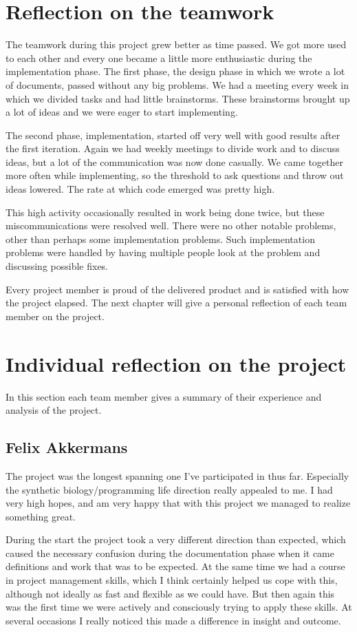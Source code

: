 \documentclass[a4paper]{article}
\begin{document}
\section{Reflection on the teamwork}
\label{team-reflection}
The teamwork during this project grew better as time passed. We got more used to each other and every one became a little more enthusiastic during the implementation phase. The first phase, the design phase in which we wrote a lot of documents, passed without any big problems. We had a meeting every week in which we divided tasks and had little brainstorms. These brainstorms brought up a lot of ideas and we were eager to start implementing.

The second phase, implementation, started off very well with good results after the first iteration. Again we had weekly meetings to divide work and to discuss ideas, but a lot of the communication was now done casually. We came together more often while implementing, so the threshold to ask questions and throw out ideas lowered. The rate at which code emerged was pretty high.

This high activity occasionally resulted in work being done twice, but these miscommunications were resolved well. There were no other notable problems, other than perhaps some implementation problems. Such implementation problems were handled by having multiple people look at the problem and discussing possible fixes.

Every project member is proud of the delivered product and is satisfied with how the project elapsed. The next chapter will give a personal reflection of each team member on the project.

\section{Individual reflection on the project} %
\label{individual-reflection}
In this section each team member gives a summary of their experience and analysis of the project.
\subsection{Felix Akkermans}
The project was the longest spanning one I've participated in thus far. Especially the synthetic biology/programming life direction really appealed to me. I had very high hopes, and am very happy that with this project we managed to realize something great.

During the start the project took a very different direction than expected, which caused the necessary confusion during the documentation phase when it came definitions and work that was to be expected. At the same time we had a course in project management skills, which I think certainly helped us cope with this, although not ideally as fast and flexible as we could have. But then again this was the first time we were actively and consciously trying to apply these skills. At several occasions I really noticed this made a difference in insight and outcome.
\end{document}
